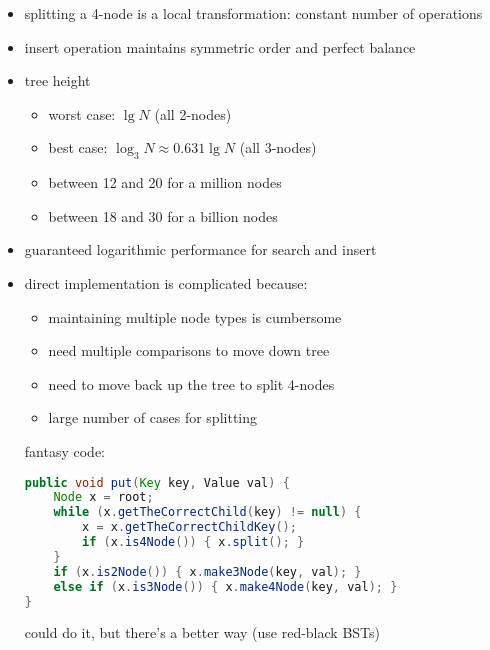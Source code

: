 \documentclass[8pt,a4paper,compress]{beamer}
\begin{document}
\begin{frame}[fragile]
\begin{itemize}
\item splitting a 4-node is a local transformation: constant number of operations

\item insert operation maintains symmetric order and perfect balance

\item tree height
\begin{itemize}
\item worst case: $\lg N$ (all 2-nodes)

\item best case: $\log_3 N \approx 0.631 \lg N$ (all 3-nodes)

\item between 12 and 20 for a million nodes

\item between 18 and 30 for a billion nodes
\end{itemize}

\item guaranteed logarithmic performance for search and insert
\end{itemize}
\end{frame}

\begin{frame}[fragile]
\begin{itemize}
\item direct implementation is complicated because:
\begin{itemize}
\item maintaining multiple node types is cumbersome

\item need multiple comparisons to move down tree

\item need to move back up the tree to split 4-nodes

\item large number of cases for splitting
\end{itemize}

\smallskip

fantasy code:
\begin{lstlisting}[language=Java]
public void put(Key key, Value val) {
    Node x = root;
    while (x.getTheCorrectChild(key) != null) {
        x = x.getTheCorrectChildKey();
        if (x.is4Node()) { x.split(); }
    }
    if (x.is2Node()) { x.make3Node(key, val); }
    else if (x.is3Node()) { x.make4Node(key, val); }
}
\end{lstlisting}

could do it, but there's a better way (use red-black BSTs)
\end{itemize}
\end{frame}
\end{document}

